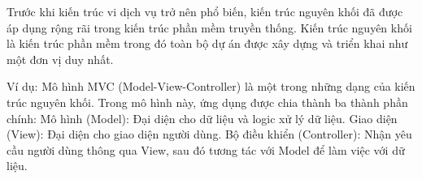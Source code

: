 


Trước khi kiến trúc vi dịch vụ trở nên phổ biến, kiến trúc nguyên khối đã được áp dụng rộng rãi trong kiến trúc phần mềm truyền thống. Kiến trúc nguyên khối là kiến trúc phần mềm trong đó toàn bộ dự án được xây dựng và triển khai như một đơn vị duy nhất.

Ví dụ: Mô hình MVC (Model-View-Controller) là một trong những dạng của kiến trúc nguyên khối.
Trong mô hình này, ứng dụng được chia thành ba thành phần chính:
Mô hình (Model): Đại diện cho dữ liệu và logic xử lý dữ liệu.
Giao diện (View): Đại diện cho giao diện người dùng.
Bộ điều khiển (Controller): Nhận yêu cầu người dùng thông qua View, sau đó tương tác với Model để làm việc với dữ liệu.
